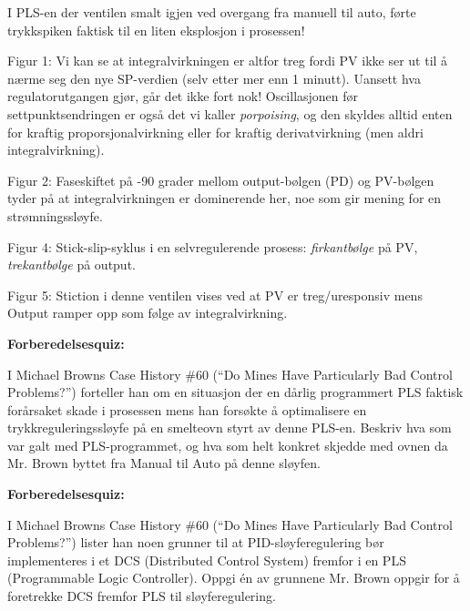 \vskip 10pt

I PLS-en der ventilen smalt igjen ved overgang fra manuell til auto, førte trykkspiken faktisk til en liten eksplosjon i prosessen!

\vskip 10pt

Figur 1: Vi kan se at integralvirkningen er altfor treg fordi PV ikke ser ut til å nærme seg den nye SP-verdien (selv etter mer enn 1 minutt). Uansett hva regulatorutgangen gjør, går det ikke fort nok! Oscillasjonen før settpunktsendringen er også det vi kaller {\it porpoising}, og den skyldes alltid enten for kraftig proporsjonalvirkning eller for kraftig derivatvirkning (men aldri integralvirkning).

\vskip 10pt

Figur 2: Faseskiftet på -90 grader mellom output-bølgen (PD) og PV-bølgen tyder på at integralvirkningen er dominerende her, noe som gir mening for en strømningssløyfe.

\vskip 10pt

Figur 4: Stick-slip-syklus i en selvregulerende prosess: {\it firkantbølge} på PV, {\it trekantbølge} på output.

\vskip 10pt

Figur 5: Stiction i denne ventilen vises ved at PV er treg/uresponsiv mens Output ramper opp som følge av integralvirkning.








\vfil \eject

\noindent
{\bf Forberedelsesquiz:}

I Michael Browns Case History \#60 (``Do Mines Have Particularly Bad Control Problems?'') forteller han om en situasjon der en dårlig programmert PLS faktisk forårsaket skade i prosessen mens han forsøkte å optimalisere en trykkreguleringssløyfe på en smelteovn styrt av denne PLS-en. Beskriv hva som var galt med PLS-programmet, og hva som helt konkret skjedde med ovnen da Mr. Brown byttet fra Manual til Auto på denne sløyfen.








\vfil \eject

\noindent
{\bf Forberedelsesquiz:}

I Michael Browns Case History \#60 (``Do Mines Have Particularly Bad Control Problems?'') lister han noen grunner til at PID-sløyferegulering bør implementeres i et DCS (Distributed Control System) fremfor i en PLS (Programmable Logic Controller). Oppgi én av grunnene Mr. Brown oppgir for å foretrekke DCS fremfor PLS til sløyferegulering.




